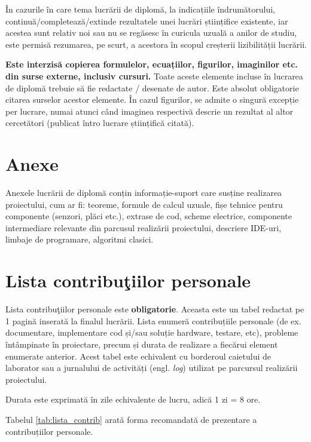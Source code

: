 În cazurile în care tema lucrării de diplomă, la indicațiile îndrumătorului, continuă/completează/extinde rezultatele unei lucrări științifice existente, iar acestea sunt relativ noi sau nu se regăsesc în curicula uzuală a anilor de studiu, este permisă rezumarea, pe scurt, a acestora în scopul creșterii lizibilității lucrării.

\textbf{Este interzisă copierea formulelor, ecuațiilor, figurilor, imaginilor etc. din surse externe, inclusiv cursuri.} Toate aceste elemente incluse în lucrarea de diplomă trebuie să fie redactate / desenate de autor. Este absolut obligatorie citarea surselor acestor elemente. În cazul figurilor, se admite o singură excepție per lucrare, numai atunci când imaginea respectivă descrie un rezultat al altor cercetători (publicat întro
lucrare științifică citată).

\section{Anexe}

Anexele lucrării de diplomă conțin informație-suport care susține realizarea proiectului, cum ar fi: teoreme, formule de calcul uzuale, fișe tehnice pentru componente (senzori, plăci etc.), extrase de cod, scheme electrice, componente intermediare relevante din parcusul realizării proiectului, descriere IDE-uri, limbaje de programare, algoritmi clasici.

\section{Lista contribuţiilor personale}

Lista contribuţiilor personale este \textbf{obligatorie}. Aceasta este un tabel redactat pe 1 pagină inserată la finalul lucrării. Lista enumeră contribuțiile personale (de ex. documentare, implementare cod și/sau soluție hardware, testare, etc), probleme întâmpinate în proiectare, precum și durata de realizare a fiecărui element enumerate anterior. Acest tabel este echivalent cu borderoul caietului de laborator sau a jurnalului de activități (engl. \emph{log}) utilizat pe parcursul realizării proiectului.

Durata este exprimată în zile echivalente de lucru, adică 1 zi = 8 ore.

Tabelul \ref{tab:lista_contrib} arată forma recomandată de prezentare a contribuțiilor personale.

